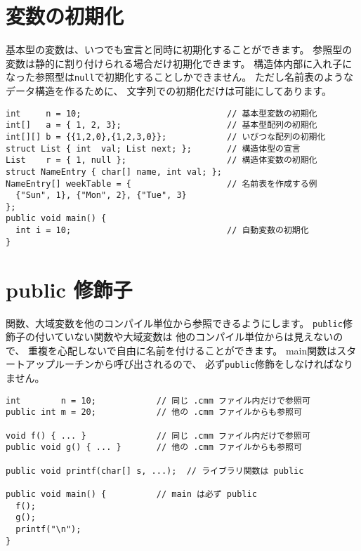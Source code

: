 \section{変数の初期化}

基本型の変数は、いつでも宣言と同時に初期化することができます。
参照型の変数は静的に割り付けられる場合だけ初期化できます。
構造体内部に入れ子になった参照型は\verb/null/で初期化することしかできません。
ただし名前表のようなデータ構造を作るために、
文字列での初期化だけは可能にしてあります。

\begin{mylist}
\begin{verbatim}
int     n = 10;                             // 基本型変数の初期化
int[]   a = { 1, 2, 3};                     // 基本型配列の初期化
int[][] b = {{1,2,0},{1,2,3,0}};            // いびつな配列の初期化
struct List { int  val; List next; };       // 構造体型の宣言
List    r = { 1, null };                    // 構造体変数の初期化
struct NameEntry { char[] name, int val; };
NameEntry[] weekTable = {                   // 名前表を作成する例
  {"Sun", 1}, {"Mon", 2}, {"Tue", 3}
};
public void main() {
  int i = 10;                               // 自動変数の初期化
}
\end{verbatim}
\end{mylist}

\section{public 修飾子}

関数、大域変数を他のコンパイル単位から参照できるようにします。
\verb/public/修飾子の付いていない関数や大域変数は
他のコンパイル単位からは見えないので、
重複を心配しないで自由に名前を付けることができます。
main関数はスタートアップルーチンから呼び出されるので、
必ず\verb/public/修飾をしなければなりません。

\begin{mylist}
\begin{verbatim}
int        n = 10;            // 同じ .cmm ファイル内だけで参照可
public int m = 20;            // 他の .cmm ファイルからも参照可

void f() { ... }              // 同じ .cmm ファイル内だけで参照可
public void g() { ... }       // 他の .cmm ファイルからも参照可

public void printf(char[] s, ...);  // ライブラリ関数は public

public void main() {          // main は必ず public
  f();
  g();
  printf("\n");
}
\end{verbatim}
\end{mylist}

